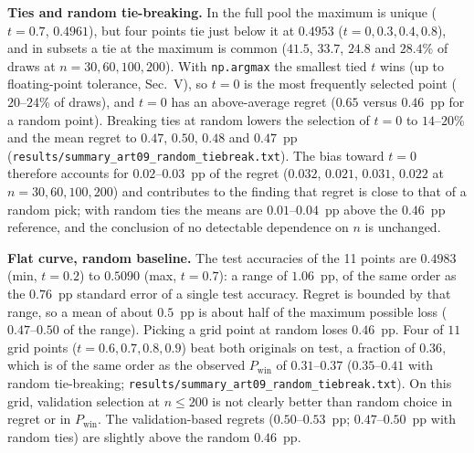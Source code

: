 \documentclass[conference]{IEEEtran}
\begin{document}
\textbf{Ties and random tie-breaking.} In the full pool the maximum is unique ($t=0.7$, $0.4961$), but four points tie just below it at $0.4953$ ($t=0,0.3,0.4,0.8$), and in subsets a tie at the maximum is common ($41.5$, $33.7$, $24.8$ and $28.4$\% of draws at $n=30,60,100,200$). With \texttt{np.argmax} the smallest tied $t$ wins (up to floating-point tolerance, Sec.~V), so $t=0$ is the most frequently selected point ($20$--$24$\% of draws), and $t=0$ has an above-average regret ($0.65$ versus $0.46$~pp for a random point). Breaking ties at random lowers the selection of $t=0$ to $14$--$20$\% and the mean regret to $0.47$, $0.50$, $0.48$ and $0.47$~pp (\texttt{results/summary\_art09\_random\_tiebreak.txt}). The bias toward $t=0$ therefore accounts for $0.02$--$0.03$~pp of the regret ($0.032$, $0.021$, $0.031$, $0.022$ at $n=30,60,100,200$) and contributes to the finding that regret is close to that of a random pick; with random ties the means are $0.01$--$0.04$~pp above the $0.46$~pp reference, and the conclusion of no detectable dependence on $n$ is unchanged.

\textbf{Flat curve, random baseline.} The test accuracies of the 11 points are $0.4983$ (min, $t=0.2$) to $0.5090$ (max, $t=0.7$): a range of $1.06$~pp, of the same order as the $0.76$~pp standard error of a single test accuracy. Regret is bounded by that range, so a mean of about $0.5$~pp is about half of the maximum possible loss ($0.47$--$0.50$ of the range). Picking a grid point at random loses $0.46$~pp. Four of $11$ grid points ($t=0.6,0.7,0.8,0.9$) beat both originals on test, a fraction of $0.36$, which is of the same order as the observed $P_{\mathrm{win}}$ of $0.31$--$0.37$ ($0.35$--$0.41$ with random tie-breaking; \texttt{results/summary\_art09\_random\_tiebreak.txt}). On this grid, validation selection at $n\le200$ is not clearly better than random choice in regret or in $P_{\mathrm{win}}$. The validation-based regrets ($0.50$--$0.53$~pp; $0.47$--$0.50$~pp with random ties) are slightly above the random $0.46$~pp.
\end{document}
